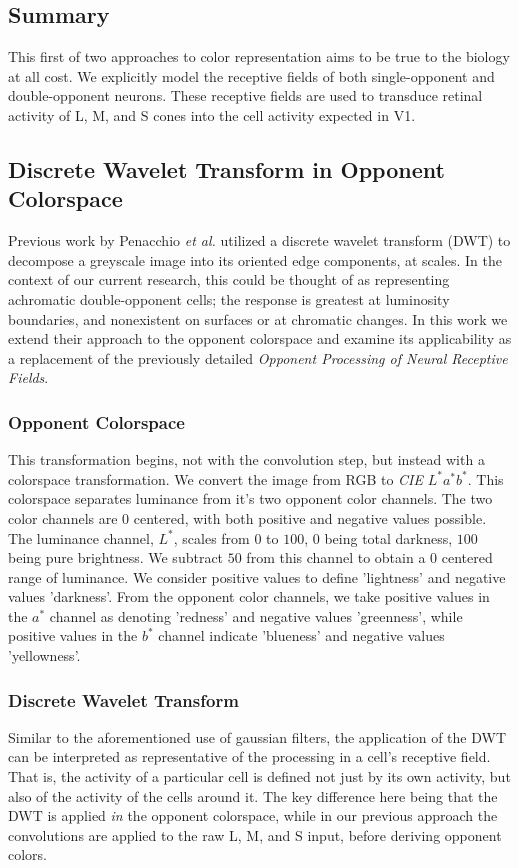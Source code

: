 \documentclass[journal,onecolumn]{IEEEtran}
\begin{document}
\subsection*{Summary}

This first of two approaches to color representation aims to be true to the biology at all cost. We explicitly model the receptive fields of both single-opponent and double-opponent neurons. These receptive fields are used to transduce retinal activity of L, M, and S cones into the cell activity expected in V1.


\subsection{Discrete Wavelet Transform in Opponent Colorspace}

Previous work by Penacchio \textit{et al.} \cite{otazu:plosive} utilized a discrete wavelet transform (DWT) to decompose a greyscale image into its oriented edge components, at scales. In the context of our current research, this could be thought of as representing achromatic double-opponent cells; the response is greatest at luminosity boundaries, and nonexistent on surfaces or at chromatic changes. In this work we extend their approach to the opponent colorspace and examine its applicability as a replacement of the previously detailed \textit{Opponent Processing of Neural Receptive Fields}.

\subsubsection*{Opponent Colorspace}
This transformation begins, not with the convolution step, but instead with a colorspace transformation. We convert the image from RGB to \textit{CIE} $L^*a^*b^*$. This colorspace separates luminance from it's two opponent color channels. The two color channels are $0$ centered, with both positive and negative values possible. The luminance channel, $L^*$, scales from $0$ to $100$, $0$ being total darkness, $100$ being pure brightness. We subtract $50$ from this channel to obtain a $0$ centered range of luminance. We consider positive values to define 'lightness' and negative values 'darkness'. From the opponent color channels, we take positive values in the $a^*$ channel as denoting 'redness' and negative values 'greenness', while positive values in the $b^*$ channel indicate 'blueness' and negative values 'yellowness'.

\subsubsection*{Discrete Wavelet Transform}
Similar to the aforementioned use of gaussian filters, the application of the DWT can be interpreted as representative of the processing in a cell's receptive field. That is, the activity of a particular cell is defined not just by its own activity, but also of the activity of the cells around it. The key difference here being that the DWT is applied \textit{in} the opponent colorspace, while in our previous approach the convolutions are applied to the raw L, M, and S input, before deriving opponent colors.
\end{document}
